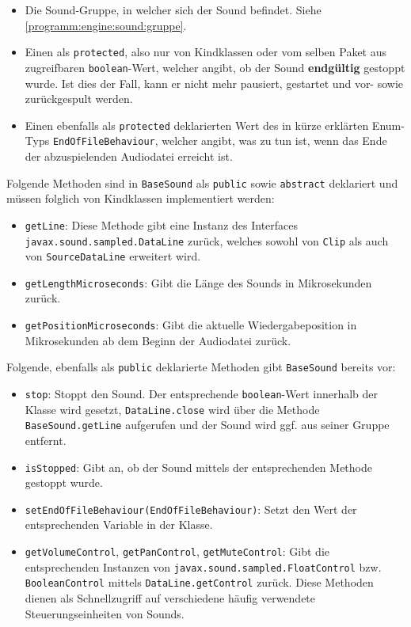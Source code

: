 \begin{sloppypar}
\begin{itemize}
	\item Die Sound-Gruppe, in welcher sich der Sound befindet. Siehe \ref{programm:engine:sound:gruppe}.
	\item Einen als \texttt{protected}, also nur von Kindklassen oder
	      vom selben Paket aus zugreifbaren \texttt{boolean}-Wert, welcher
	      angibt, ob der Sound \textbf{endgültig} gestoppt wurde. Ist dies
	      der Fall, kann er nicht mehr pausiert, gestartet und vor- sowie
	      zurückgespult werden.
	\item Einen ebenfalls als \texttt{protected} deklarierten Wert des
	      in kürze erklärten Enum-Typs \texttt{EndOfFileBehaviour}, welcher
	      angibt, was zu tun ist, wenn das Ende der abzuspielenden Audiodatei
	      erreicht ist.
\end{itemize}

Folgende Methoden sind in \texttt{BaseSound} als \texttt{public} sowie
\texttt{abstract} deklariert und müssen folglich von Kindklassen implementiert
werden:

\begin{itemize}
	\item \texttt{getLine}: Diese Methode gibt eine Instanz des Interfaces
	      \texttt{javax.sound.sampled.DataLine} zurück, welches sowohl
	      von \texttt{Clip} als auch von \texttt{SourceDataLine} erweitert wird.
	\item \texttt{getLengthMicroseconds}: Gibt die Länge des Sounds in Mikrosekunden zurück.
	\item \texttt{getPositionMicroseconds}: Gibt die aktuelle Wiedergabeposition
	      in Mikrosekunden ab dem Beginn der Audiodatei zurück.
\end{itemize}

Folgende, ebenfalls als \texttt{public} deklarierte Methoden gibt \texttt{BaseSound} bereits vor:

\begin{itemize}
	\item \texttt{stop}: Stoppt den Sound. Der entsprechende \texttt{boolean}-Wert
	      innerhalb der Klasse wird gesetzt, \texttt{DataLine.close} wird über
	      die Methode \texttt{BaseSound.getLine} aufgerufen und der Sound wird
	      ggf. aus seiner Gruppe entfernt.
	\item \texttt{isStopped}: Gibt an, ob der Sound mittels der entsprechenden
	      Methode gestoppt wurde.
	\item \texttt{setEndOfFileBehaviour(EndOfFileBehaviour)}: Setzt den Wert der
	      entsprechenden Variable in der Klasse.
	\item \texttt{getVolumeControl}, \texttt{getPanControl}, \texttt{getMuteControl}:
	      Gibt die entsprechenden Instanzen von \texttt{javax.sound.sampled.FloatControl}
	      bzw. \texttt{BooleanControl} mittels \texttt{DataLine.getControl} zurück.
	      Diese Methoden dienen als Schnellzugriff auf verschiedene häufig verwendete
	      Steuerungseinheiten von Sounds.
\end{itemize}


\end{sloppypar}

